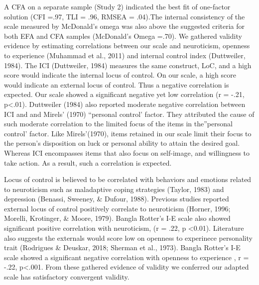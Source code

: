 \documentclass[
  man]{apa6}
\begin{document}
A CFA on a separate sample (Study 2) indicated the best fit of one-factor solution (CFI =.97, TLI = .96, RMSEA = .04).The internal consistency of the scale measured by McDonald's omega was also above the suggested criteria for both EFA and CFA samples (McDonald's Omega =.70). We gathered validity evidence by estimating correlations between our scale and neuroticism, openness to experience (Muhammad et al., 2011) and internal control index (Duttweiler, 1984). The ICI (Duttweiler, 1984) measures the same construct, LoC, and a high score would indicate the internal locus of control. On our scale, a high score would indicate an external locus of control. Thus a negative correlation is expected. Our scale showed a significant negative yet low correlation (r = -.21, p\textless.01). Duttweiler (1984) also reported moderate negative correlation between ICI and and Mirels' (1970) ``personal control' factor. They attributed the cause of such moderate correlation to the limited focus of the items in the''personal control' factor. Like Mirels'(1970), items retained in our scale limit their focus to the person's disposition on luck or personal ability to attain the desired goal. Whereas ICI encompasses items that also focus on self-image, and willingness to take action. As a result, such a correlation is expected.

Locus of control is believed to be correlated with behaviors and emotions related to neuroticism such as maladaptive coping strategies (Taylor, 1983) and depression (Benassi, Sweeney, \& Dufour, 1988). Previous studies reported external locus of control positively correlate to neuroticism (Horner, 1996; Morelli, Krotinger, \& Moore, 1979). Bangla Rotter's I-E scale also showed significant positive correlation with neuroticism, (r = .22, p \textless0.01). Literature also suggests the externals would score low on openness to experinece personality trait (Rodrigues \& Deuskar, 2018; Sherman et al., 1973). Bangla Rotter's I-E scale showed a significant negative correlation with openness to experience , r = -.22, p\textless.001. From these gathered evidence of validity we conferred our adapted scale has satisfactory convergent validity.
\end{document}
